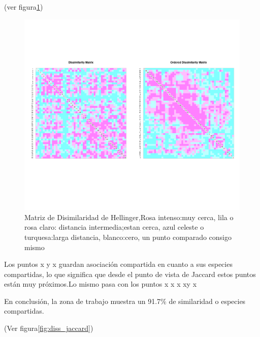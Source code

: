 \documentclass[11pt,]{article}
\begin{document}
(ver figura\ref{fig:diss_hellinger})

\begin{figure}
\centering
\includegraphics{diss_hellinger.png}
\caption{\label{fig:diss_hellinger}Matriz de Disimilaridad de
Hellinger,Rosa intenso:muy cerca, lila o rosa claro: distancia
intermedia;estan cerca, azul celeste o turquesa:larga distancia,
blanco:cero, un punto comparado consigo mismo}
\end{figure}

Los puntos x y x guardan asociación compartida en cuanto a sus especies
compartidas, lo que significa que desde el punto de vista de Jaccard
estos puntos están muy próximos.Lo mismo pasa con los puntos x x x xy x

En conclusión, la zona de trabajo muestra un 91.7\% de similaridad o
especies compartidas.

(Ver figura\ref{fig:diss_jaccard})
\end{document}
